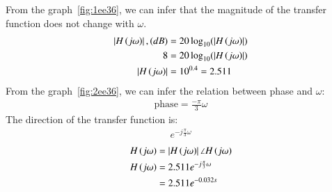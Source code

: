 \documentclass[journal,12pt,twocolumn]{IEEEtran}
\theoremstyle{remark}
\begin{document}
    \solution
    From the graph~\ref{fig:1ee36}, we can infer that the magnitude of the transfer function does not change with $\omega$.
    \begin{align}
        \left\vert{H}\left(j\omega\right)\right\vert, ({dB}) &= 20\log_{10}(\left\vert{H}\left(j\omega\right)\right\vert) \\
        8 &= 20\log_{10}(\left\vert{H}\left(j\omega\right)\right\vert)\\
        \left\vert{H}\left(j\omega\right)\right\vert &= 10^{0.4} = 2.511
    \end{align}
    From the graph~\ref{fig:2ee36}, we can infer the relation between phase and $\omega$:
    \begin{align}
        \text{phase} = \frac{-\pi}{3}\omega
    \end{align}
    The direction of the transfer function is:
    \begin{align}
        e^{-j\frac{\pi}{3}\omega}
    \end{align}
    \begin{align}
        H\left(j\omega\right) &= \left\vert H\left(j\omega\right)\right\vert\angle H\left(j\omega\right)\\
        H\left(j\omega\right) &= 2.511 e^{-j\frac{\pi}{3}\omega} \\
        &= 2.511 e^{-0.032s}
    \end{align}
    \setcounter{figure}{1} %
\end{document}
